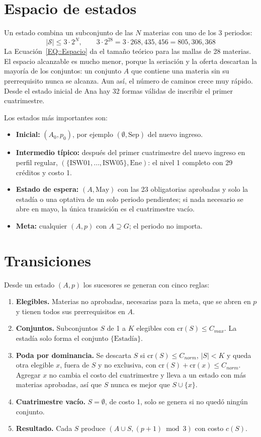 \section{Espacio de estados}
Un estado combina un subconjunto de las $N$ materias con uno de los 3 periodos:
\begin{equation}
    \label{EQ::Espacio}
    |\mathcal{S}| \leq 3 \cdot 2^{N}, \qquad 3 \cdot 2^{28} = 3 \cdot 268{,}435{,}456 = 805{,}306{,}368
\end{equation}
La Ecuación~\eqref{EQ::Espacio} da el tamaño teórico para las mallas de 28 materias. El espacio alcanzable es mucho menor, porque la seriación y la oferta descartan la mayoría de los conjuntos: un conjunto $A$ que contiene una materia sin su prerrequisito nunca se alcanza. Aun así, el número de caminos crece muy rápido. Desde el estado inicial de Ana hay 32 formas válidas de inscribir el primer cuatrimestre.

Los estados más importantes son:
\begin{itemize}
    \item \textbf{Inicial:} $(A_0, p_0)$, por ejemplo $(\emptyset, \text{Sep})$ del nuevo ingreso.
    \item \textbf{Intermedio típico:} después del primer cuatrimestre del nuevo ingreso en perfil regular, $(\{\text{ISW01}, \ldots, \text{ISW05}\}, \text{Ene})$: el nivel 1 completo con 29 créditos y costo 1.
    \item \textbf{Estado de espera:} $(A, \text{May})$ con las 23 obligatorias aprobadas y solo la estadía o una optativa de un solo periodo pendientes; si nada necesario se abre en mayo, la única transición es el cuatrimestre vacío.
    \item \textbf{Meta:} cualquier $(A, p)$ con $A \supseteq G$; el periodo no importa.
\end{itemize}

\section{Transiciones}
Desde un estado $(A, p)$ los sucesores se generan con cinco reglas:
\begin{enumerate}
    \item \textbf{Elegibles.} Materias no aprobadas, necesarias para la meta, que se abren en $p$ y tienen todos sus prerrequisitos en $A$.
    \item \textbf{Conjuntos.} Subconjuntos $S$ de 1 a $K$ elegibles con $\mathrm{cr}(S) \leq C_{max}$. La estadía solo forma el conjunto $\{\text{Estadía}\}$.
    \item \textbf{Poda por dominancia.} Se descarta $S$ si $\mathrm{cr}(S) \leq C_{norm}$, $|S| < K$ y queda otra elegible $x$, fuera de $S$ y no exclusiva, con $\mathrm{cr}(S) + \mathrm{cr}(x) \leq C_{norm}$. Agregar $x$ no cambia el costo del cuatrimestre y lleva a un estado con más materias aprobadas, así que $S$ nunca es mejor que $S \cup \{x\}$.
    \item \textbf{Cuatrimestre vacío.} $S = \emptyset$, de costo 1, solo se genera si no quedó ningún conjunto.
    \item \textbf{Resultado.} Cada $S$ produce $(A \cup S, (p+1) \bmod 3)$ con costo $c(S)$.
\end{enumerate}

